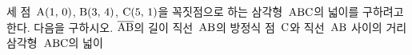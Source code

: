 세 점~$\mathrm{A}(1,\,0)$, $\mathrm{B}(3,\,4)$, $\mathrm{C}(5,\,1)$을 꼭짓점으로 하는 삼각형~$\mathrm{ABC}$의 넓이를 구하려고 한다. 다음을 구하시오.
 $\overline{\mathrm{AB}}$의 길이
 직선~$\mathrm{AB}$의 방정식
 점~$\mathrm{C}$와 직선~$\mathrm{AB}$ 사이의 거리
 삼각형~$\mathrm{ABC}$의 넓이
